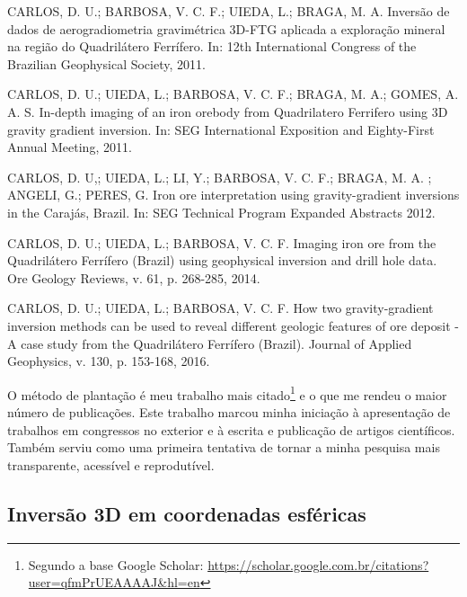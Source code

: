 \begin{displayquote}
    CARLOS, D. U.; BARBOSA, V. C. F.; UIEDA, L.; BRAGA, M. A. Inversão de
    dados de aerogradiometria gravimétrica 3D-FTG aplicada a exploração mineral
    na região do Quadrilátero Ferrífero. In: 12th International Congress of the
    Brazilian Geophysical Society, 2011.
\end{displayquote}

\begin{displayquote}
    CARLOS, D. U.; UIEDA, L.; BARBOSA, V. C. F.; BRAGA,
    M. A.; GOMES, A. A. S. In-depth imaging of an iron
    orebody from Quadrilatero Ferrifero using 3D gravity gradient inversion.
    In: SEG International Exposition and Eighty-First Annual Meeting, 2011.
\end{displayquote}

\begin{displayquote}
    CARLOS, D. U,; UIEDA, L.; LI, Y.; BARBOSA, V.
    C. F.; BRAGA, M. A. ; ANGELI, G.; PERES, G. Iron ore
    interpretation using gravity-gradient inversions in the Carajás, Brazil.
    In: SEG Technical Program Expanded Abstracts 2012.
\end{displayquote}

\begin{displayquote}
    CARLOS, D. U.; UIEDA, L.; BARBOSA, V. C. F. Imaging
    iron ore from the Quadrilátero Ferrífero (Brazil) using geophysical
    inversion and drill hole data. Ore Geology Reviews, v. 61, p. 268-285,
    2014.
\end{displayquote}

\begin{displayquote}
    CARLOS, D. U.; UIEDA, L.; BARBOSA, V. C. F. How two
    gravity-gradient inversion methods can be used to reveal different geologic
    features of ore deposit - A case study from the Quadrilátero Ferrífero
    (Brazil). Journal of Applied Geophysics, v. 130, p. 153-168, 2016.
\end{displayquote}


O método de plantação \citep{seed} é meu trabalho mais citado\footnote{Segundo
a base Google Scholar:
\url{https://scholar.google.com.br/citations?user=qfmPrUEAAAAJ&hl=en}} e o que
me rendeu o maior número de publicações.
Este trabalho marcou minha iniciação
à apresentação de trabalhos em congressos no exterior e
à escrita e publicação de artigos científicos.
Também serviu como uma primeira tentativa de tornar a minha pesquisa mais
transparente, acessível e reprodutível.


\subsection{Inversão 3D em coordenadas esféricas}

